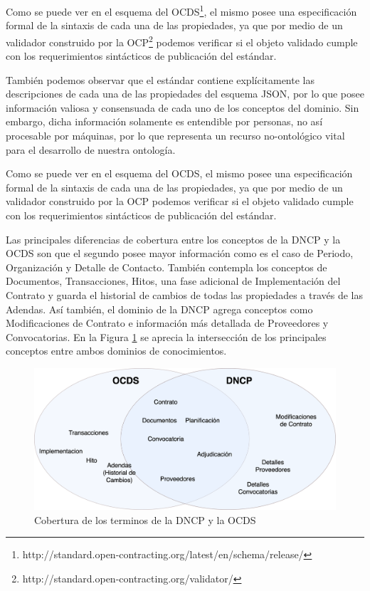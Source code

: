 Como se puede ver en el esquema del OCDS\footnote{http://standard.open-contracting.org/latest/en/schema/release/}, el mismo posee una especificación formal de la sintaxis de cada una de las propiedades, ya que por medio de un validador construido por la OCP\footnote{http://standard.open-contracting.org/validator/} podemos verificar si el objeto validado cumple con los requerimientos sintácticos de publicación del estándar.

También podemos observar que el estándar contiene explícitamente las descripciones de cada una de las propiedades del esquema JSON, por lo que posee información valiosa y consensuada de cada uno de los conceptos del dominio. Sin embargo, dicha información solamente es entendible por personas, no así procesable por máquinas, por lo que representa un recurso no-ontológico vital para el desarrollo de nuestra ontología.

Como se puede ver en el esquema del OCDS, el mismo posee una especificación formal de la sintaxis de cada una de las propiedades, ya que por medio de un validador construido por la OCP podemos verificar si el objeto validado cumple con los requerimientos sintácticos de publicación del estándar.

Las principales diferencias de cobertura entre los conceptos de la DNCP y la OCDS son que el segundo posee mayor información como es el caso de Periodo, Organización y Detalle de Contacto. También contempla los conceptos de Documentos, Transacciones, Hitos, una fase adicional de Implementación del Contrato y guarda el historial de cambios de todas las propiedades a través de las Adendas. Así también, el dominio de la DNCP agrega conceptos como Modificaciones de Contrato e información más detallada de Proveedores y Convocatorias. En la Figura \ref{img:coberturaontologia} se aprecia la intersección de los principales conceptos entre ambos dominios de conocimientos. 

\begin{figure}[ht!]
    \centering
    \includegraphics[width=150mm]{figuras/Diagramas-VennCobertura.png}
    \caption{Cobertura de los terminos de la DNCP y la OCDS}
    \label{img:coberturaontologia}
\end{figure}


